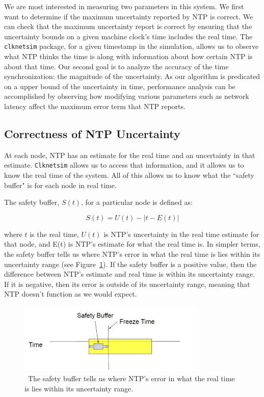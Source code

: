 We are most interested in measuring two parameters in
this system. We first want to determine if the maximum uncertainty
reported by NTP is correct. We can check that the maximum uncertainty
report is correct by ensuring that the uncertainty bounds on a given machine
clock's time includes the real time.
The \texttt{clknetsim} package, for a
given timestamp in the simulation, allows us to observe what NTP
thinks the time is along with information about how certain NTP is
about that time. Our second goal is to analyze the accuracy of the time
synchronization: the magnitude of the uncertainty. 
As our algorithm is predicated on a upper
bound of the uncertainty in time, performance analysis can be
accomplished by observing how modifying various parameters such as
network latency affect the maximum error term that NTP reports.

\subsection{Correctness of NTP Uncertainty}

At each node, NTP has an estimate for the real time and an uncertainty
in that estimate. \texttt{Clknetsim} allows us to access that information, and
it allows us to know the real time of the system. All of this allows
us to know what the ``safety buffer" is for each node in real time.

The safety buffer, $S(t)$,  for a particular node is defined as:

\[ S(t) = U(t) - | t - E(t)| \]

where $t$ is the real time, $U(t)$ is NTP's uncertainty in the real
time estimate for that node, and E(t) is NTP's estimate for what the
real time is. In simpler terms, the safety buffer tells us where NTP's
error in what the real time is lies within its uncertainty range (see
Figure~\ref{fig:safety-diag}). If the safety buffer is a positive
value, then the difference between NTP's estimate and real time is
within its uncertainty range. If it is negative, then its error is
outside of its uncertainty range, meaning that NTP doesn't function as
we would expect.

\begin{figure}[!htbp]
  \caption{~The safety buffer tells us where NTP's error in what the real time is lies within its uncertainty range.} 
  \label{fig:safety-diag}
  \centering
  \includegraphics[width=0.8\textwidth]{safety-diagram.png}
\end{figure}

